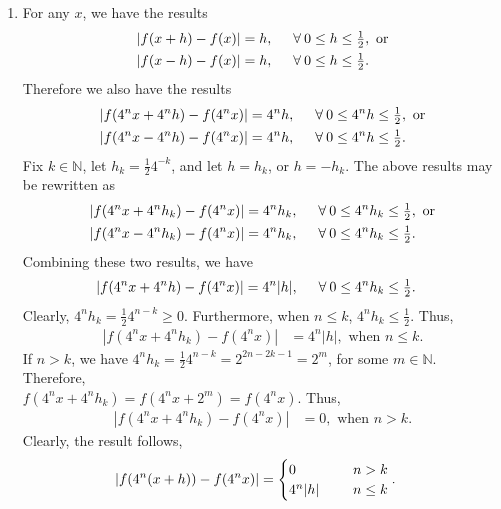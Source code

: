 \documentclass[a4paper,11pt]{article}
\newcommand{\ds}{\displaystyle}
\begin{document}
{{\begin{enumerate}[leftmargin=*]
\begin{enumerate}[label=\roman*)]
			\item For any $\ds{x}$, we have the results
				\begin{align*}
					\left|f(x+h) - f(x)\right| & = h, \hspace{5mm} \forall \: 0 \leq h \leq \tfrac{1}{2}, \text{ or} \\
					\left|f(x-h) - f(x)\right| & = h, \hspace{5mm} \forall \: 0 \leq h \leq \tfrac{1}{2}.
				\end{align*}
				Therefore we also have the results
				\begin{align*}
					\left|f(4^nx+4^nh) - f(4^nx)\right| & = 4^nh, \hspace{5mm} \forall \: 0 \leq 4^nh \leq \tfrac{1}{2}, \text{ or} \\
					\left|f(4^nx-4^nh) - f(4^nx)\right| & = 4^nh, \hspace{5mm} \forall \: 0 \leq 4^nh \leq \tfrac{1}{2}.
				\end{align*}
				Fix $\ds{k \in \mathbb{N}}$, let $\ds{h_k = \tfrac{1}{2}4^{-k}}$, and let $\ds{h=h_k}$, or $\ds{h=-h_k}$. The above results may be rewritten as  
				\begin{align*}
					\left|f(4^nx+4^nh_k) - f(4^nx)\right| & = 4^nh_k, \hspace{5mm} \forall \: 0 \leq 4^nh_k \leq \tfrac{1}{2}, \text{ or} \\
					\left|f(4^nx-4^nh_k) - f(4^nx)\right| & = 4^nh_k, \hspace{5mm} \forall \: 0 \leq 4^nh_k \leq \tfrac{1}{2}.
				\end{align*}
				Combining these two results, we have
				\begin{align*}
					\left|f(4^nx+4^nh) - f(4^nx)\right| & = 4^n|h|, \hspace{5mm} \forall \: 0 \leq 4^nh_k \leq \tfrac{1}{2}.
				\end{align*}
				Clearly, $\ds{4^n h_k = \tfrac{1}{2}4^{n-k} \geq 0}$. Furthermore, when $\ds{n \leq k}$, $\ds{4^n h_k \leq \tfrac{1}{2}}$. Thus, 
				\begin{align*}
					\left|f(4^nx+4^nh_k) - f(4^nx)\right| & = 4^n|h|, \text{ when } n \leq k.
				\end{align*}
				If $\ds{n > k}$, we have $\ds{4^n h_k = \tfrac{1}{2}4^{n-k} = 2^{2n-2k-1} = 2^{m}}$, for some $\ds{m \in \mathbb{N}}$. Therefore, \\ $\ds{f(4^nx+4^nh_k) = f(4^nx+2^m) = f(4^nx)}$. Thus, 
				\begin{align*}
					\left|f(4^nx+4^nh_k) - f(4^nx)\right| & = 0, \text{ when } n > k.
				\end{align*}
				Clearly, the result follows,
				\begin{align*}
					\left|f(4^n(x+h)) - f(4^nx)\right| & = 
					\begin{cases} 
						0 & n > k \\
						4^n|h| \hspace{5mm} & n \leq k
					\end{cases}.
				\end{align*}


\end{enumerate}
\end{enumerate}}}
\end{document}
